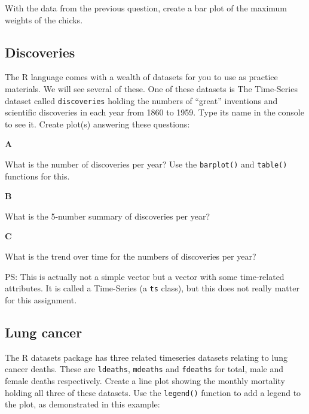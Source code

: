 \documentclass[]{book}
\begin{document}
With the data from the previous question, create a bar plot of the maximum weights of the chicks.

\hypertarget{discoveries}{%
\subsection{Discoveries}\label{discoveries}}

The R language comes with a wealth of datasets for you to use as practice materials. We will see several of these. One of these datasets is The Time-Series dataset called \texttt{discoveries} holding the numbers of ``great'' inventions and scientific discoveries in each year from 1860 to 1959. Type its name in the console to see it. Create plot(s) answering these questions:

\textbf{A}

What is the number of discoveries per year? Use the \texttt{barplot()} and \texttt{table()} functions for this.

\textbf{B}

What is the 5-number summary of discoveries per year?

\textbf{C}

What is the trend over time for the numbers of discoveries per year?

PS: This is actually not a simple vector but a vector with some time-related attributes. It is called a Time-Series (a \texttt{ts} class), but this does not really matter for this assignment.

\hypertarget{lung-cancer}{%
\subsection{Lung cancer}\label{lung-cancer}}

The R datasets package has three related timeseries datasets relating to lung cancer deaths. These are \texttt{ldeaths}, \texttt{mdeaths} and \texttt{fdeaths} for total, male and female deaths respectively. Create a line plot showing the monthly mortality holding all three of these datasets. Use the \texttt{legend()} function to add a legend to the plot, as demonstrated in this example:
\end{document}
